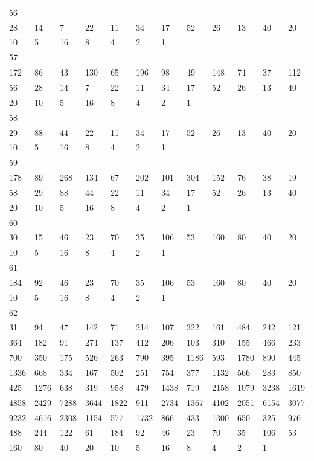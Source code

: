 \begin{longtable}{llllllllllll}
56&&&&&&&&&&&\\
28& 14& 7& 22& 11& 34& 17& 52& 26& 13& 40& 20\\
10& 5& 16& 8& 4& 2& 1& \\

57&&&&&&&&&&&\\
172& 86& 43& 130& 65& 196& 98& 49& 148& 74& 37& 112\\
56& 28& 14& 7& 22& 11& 34& 17& 52& 26& 13& 40\\
20& 10& 5& 16& 8& 4& 2& 1& \\

58&&&&&&&&&&&\\
29& 88& 44& 22& 11& 34& 17& 52& 26& 13& 40& 20\\
10& 5& 16& 8& 4& 2& 1& \\

59&&&&&&&&&&&\\
178& 89& 268& 134& 67& 202& 101& 304& 152& 76& 38& 19\\
58& 29& 88& 44& 22& 11& 34& 17& 52& 26& 13& 40\\
20& 10& 5& 16& 8& 4& 2& 1& \\

60&&&&&&&&&&&\\
30& 15& 46& 23& 70& 35& 106& 53& 160& 80& 40& 20\\
10& 5& 16& 8& 4& 2& 1& \\

61&&&&&&&&&&&\\
184& 92& 46& 23& 70& 35& 106& 53& 160& 80& 40& 20\\
10& 5& 16& 8& 4& 2& 1& \\

62&&&&&&&&&&&\\
31& 94& 47& 142& 71& 214& 107& 322& 161& 484& 242& 121\\
364& 182& 91& 274& 137& 412& 206& 103& 310& 155& 466& 233\\
700& 350& 175& 526& 263& 790& 395& 1186& 593& 1780& 890& 445\\
1336& 668& 334& 167& 502& 251& 754& 377& 1132& 566& 283& 850\\
425& 1276& 638& 319& 958& 479& 1438& 719& 2158& 1079& 3238& 1619\\
4858& 2429& 7288& 3644& 1822& 911& 2734& 1367& 4102& 2051& 6154& 3077\\
9232& 4616& 2308& 1154& 577& 1732& 866& 433& 1300& 650& 325& 976\\
488& 244& 122& 61& 184& 92& 46& 23& 70& 35& 106& 53\\
160& 80& 40& 20& 10& 5& 16& 8& 4& 2& 1& \\


\end{longtable}
